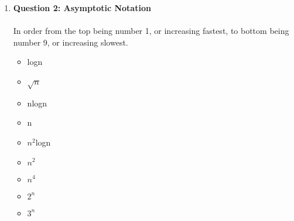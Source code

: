 \documentclass[11pt]{article}
\begin{document}
\begin{enumerate}
\item
\textbf{Question 2: Asymptotic Notation} \\ \\ %
In order from the top being number 1, or increasing fastest, to bottom being number 9, or increasing slowest. 
\begin{itemize}
\item %
logn 
\item %
$\sqrt{n}$ 
\item %
nlogn 
\item %
n
\item %
$n^{2}$logn 
\item %
$n^{2}$ 
\item %
$n^{4}$ 
\item %
$2^{n}$ 
\item %
$3^{n}$ 
\end{itemize}


\end{enumerate}
\end{document}
